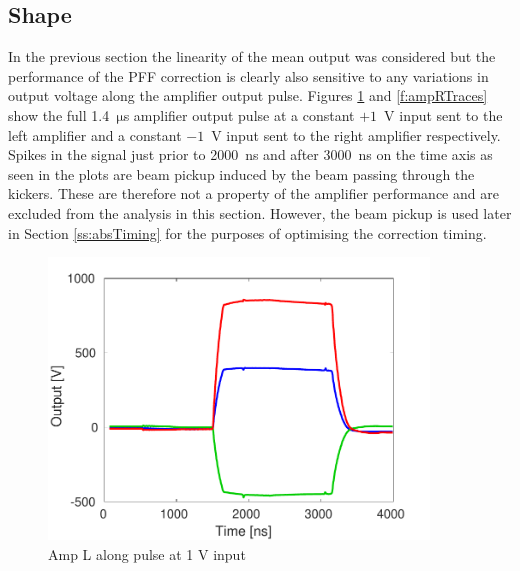 \subsection{Shape}
\label{ss:ampShape}

In the previous section the linearity of the mean output was considered but the performance of the PFF correction is clearly also sensitive to any variations in output voltage along the amplifier output pulse. Figures \ref{f:ampLTraces} and \ref{f:ampRTraces} show the full 1.4~\(\mathrm{\mu}\)s amplifier output pulse at a constant \(+1\)~V input sent to the left amplifier and a constant \(-1\)~V input sent to the right amplifier respectively. Spikes in the signal just prior to 2000~ns and after 3000~ns on the time axis as seen in the plots are beam pickup induced by the beam passing through the kickers. These are therefore not a property of the amplifier performance and are excluded from the analysis in this section. However, the beam pickup is used later in Section \ref{ss:absTiming} for the purposes of optimising the correction timing.

\begin{figure}
  \centering
  \includegraphics[width=0.9\textwidth]{Figures/commissioning/AmpL_Traces}
  \caption{Amp L along pulse at 1 V input}
  \label{f:ampLTraces}
\end{figure}

